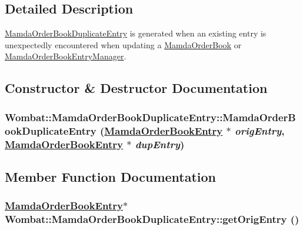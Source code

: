 \subsection{Detailed Description}
\hyperlink{classWombat_1_1MamdaOrderBookDuplicateEntry}{Mamda\-Order\-Book\-Duplicate\-Entry} is generated when an existing entry is unexpectedly encountered when updating a \hyperlink{classWombat_1_1MamdaOrderBook}{Mamda\-Order\-Book} or \hyperlink{classWombat_1_1MamdaOrderBookEntryManager}{Mamda\-Order\-Book\-Entry\-Manager}. 



\subsection{Constructor \& Destructor Documentation}
\hypertarget{classWombat_1_1MamdaOrderBookDuplicateEntry_a5171895c879bb9e96daa4bff3617b94}{
\subsubsection[MamdaOrderBookDuplicateEntry]{\setlength{\rightskip}{0pt plus 5cm}Wombat::Mamda\-Order\-Book\-Duplicate\-Entry::Mamda\-Order\-Book\-Duplicate\-Entry (\hyperlink{classWombat_1_1MamdaOrderBookEntry}{Mamda\-Order\-Book\-Entry} $\ast$ {\em orig\-Entry}, \hyperlink{classWombat_1_1MamdaOrderBookEntry}{Mamda\-Order\-Book\-Entry} $\ast$ {\em dup\-Entry})}}
\label{classWombat_1_1MamdaOrderBookDuplicateEntry_a5171895c879bb9e96daa4bff3617b94}




\subsection{Member Function Documentation}
\hypertarget{classWombat_1_1MamdaOrderBookDuplicateEntry_9db97c68200bc29e87022a3227974d8e}{
\subsubsection[getOrigEntry]{\setlength{\rightskip}{0pt plus 5cm}\hyperlink{classWombat_1_1MamdaOrderBookEntry}{Mamda\-Order\-Book\-Entry}$\ast$ Wombat::Mamda\-Order\-Book\-Duplicate\-Entry::get\-Orig\-Entry ()}}
\label{classWombat_1_1MamdaOrderBookDuplicateEntry_9db97c68200bc29e87022a3227974d8e}


